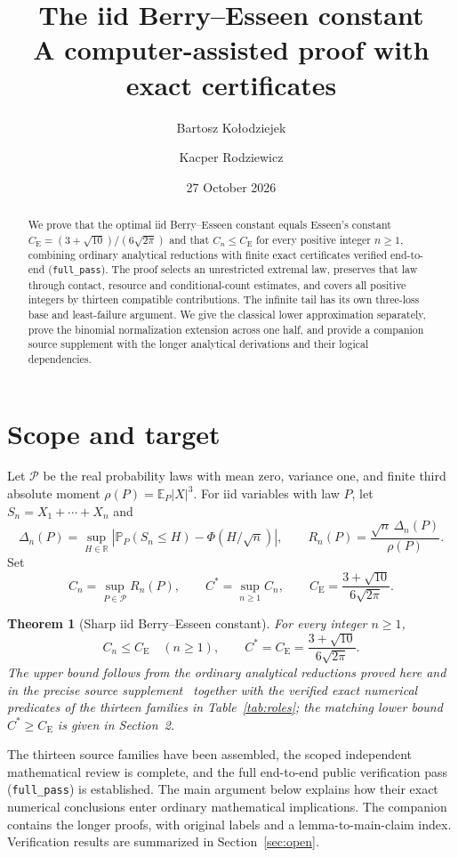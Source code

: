 \documentclass[11pt,a4paper]{article}
\title{The iid Berry--Esseen constant\\
\large A computer-assisted proof with exact certificates}
\author{Bartosz Ko{\l}odziejek \and Kacper Rodziewicz}
\date{27 October 2026}
\newtheorem{theorem}{Theorem}[section]
\newcommand{\E}{\mathbb E}
\newcommand{\Pp}{\mathbb P}
\newcommand{\R}{\mathbb R}
\newcommand{\CE}{C_{\mathrm E}}
\begin{document}
\maketitle
\begin{abstract}
We prove that the optimal iid Berry--Esseen constant equals Esseen's constant
$\CE=(3+\sqrt{10})/(6\sqrt{2\pi})$ and that $C_n\le\CE$ for every positive
integer $n\ge1$, combining ordinary analytical reductions with finite exact
certificates verified end-to-end (\texttt{full\_pass}). The proof
selects an unrestricted extremal law, preserves that law through contact,
resource and conditional-count estimates, and covers all positive integers
by thirteen compatible contributions. The infinite tail has its own
three-loss base and least-failure argument. We give the classical lower
approximation separately, prove the binomial normalization extension across
one half, and provide a companion source supplement with the longer
analytical derivations and their logical dependencies.
\end{abstract}

\section{Scope and target}
Let \(\mathcal P\) be the real probability laws with mean zero, variance one,
and finite third absolute moment \(\rho(P)=\E_P|X|^3\). For iid variables
with law \(P\), let \(S_n=X_1+\cdots+X_n\) and
\[
 \Delta_n(P)=\sup_{H\in\R}
       |\Pp_P(S_n\le H)-\Phi(H/\sqrt n)|,\qquad
 R_n(P)=\frac{\sqrt n\,\Delta_n(P)}{\rho(P)}.
\]
Set
\[
 C_n=\sup_{P\in\mathcal P}R_n(P),\qquad C^*=\sup_{n\ge1}C_n,\qquad
 \CE=\frac{3+\sqrt{10}}{6\sqrt{2\pi}}.
\]
\begin{theorem}[Sharp iid Berry--Esseen constant]\label{thm:global}
For every integer $n\ge1$,
\[
 C_n\le\CE\quad(n\ge1),\qquad C^*=\CE=\frac{3+\sqrt{10}}{6\sqrt{2\pi}}.
\]
The upper bound follows from the ordinary analytical reductions proved here
and in the precise source supplement~\cite{source} together with the verified
exact numerical predicates of the thirteen families in Table~\ref{tab:roles};
the matching lower bound $C^*\ge\CE$ is given in Section~2.
\end{theorem}
The thirteen source families have been assembled, the scoped independent
mathematical review is complete, and the full end-to-end public verification
pass (\texttt{full\_pass}) is established. The main argument below explains how
their exact numerical conclusions enter ordinary mathematical implications.
The companion  contains the longer proofs,
with original labels and a lemma-to-main-claim index. Verification results
are summarized in Section~\ref{sec:open}.
\end{document}
